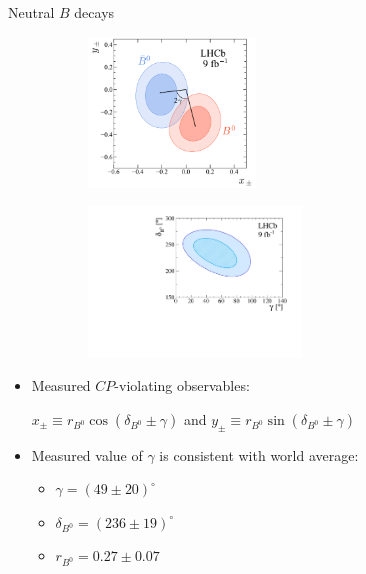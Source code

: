 \documentclass[xcolor={dvipsnames}]{beamer}
\begin{document}
\begin{frame}{Neutral $B$ decays}
  \begin{figure}
    \begin{subfigure}{0.45\textwidth}
      \includegraphics[height = 4.0cm]{Plots/cp_contours_B0toDKst.pdf}
    \end{subfigure}%
    \begin{subfigure}{0.45\textwidth}
      \includegraphics[height = 4.0cm]{Plots/B0ToDKStar_GGSZ_g_db_B0toDKst.pdf}
    \end{subfigure}
  \end{figure}
  \begin{itemize}
    \setlength\itemsep{0.5em}
    \item{Measured $C\!P$-violating observables:}
    \begin{center}
      $x_\pm\equiv r_{B^0}\cos(\delta_{B^0} \pm \gamma)$ and $y_\pm\equiv r_{B^0}\sin(\delta_{B^0} \pm \gamma)$
    \end{center}
    \item{Measured value of $\gamma$ is consistent with world average:}
    \begin{itemize}
      \item{$\gamma = (49 \pm 20)^\circ$}
      \item{$\delta_{B^0} = (236 \pm 19)^\circ$}
      \item{$r_{B^0} = 0.27 \pm 0.07$}
    \end{itemize}
  \end{itemize}
\end{frame}
\end{document}

